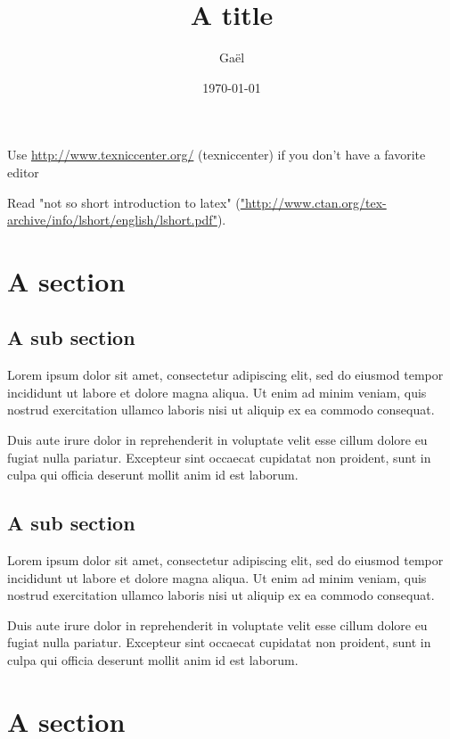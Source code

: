 \documentclass{article}
\begin{document}
\author{Gaël}
\date{\today}

\title{A title}

\maketitle

\tableofcontents

\pagebreak

Use \url{http://www.texniccenter.org/} (texniccenter) if you don't have a
favorite editor

Read "not so short introduction to latex"
(\url{"http://www.ctan.org/tex-archive/info/lshort/english/lshort.pdf"}).

\section{A section}

\subsection{A sub section}

Lorem ipsum dolor sit amet, consectetur adipiscing elit, sed do eiusmod
tempor incididunt ut labore et dolore magna aliqua. Ut enim ad minim
veniam, quis nostrud exercitation ullamco laboris nisi ut aliquip ex ea
commodo consequat.

\bigskip

Duis aute irure dolor in reprehenderit in voluptate velit esse cillum
dolore eu fugiat nulla pariatur. Excepteur sint occaecat cupidatat non
proident, sunt in culpa qui officia deserunt mollit anim id est laborum.

\subsection{A sub section}

Lorem ipsum dolor sit amet, consectetur adipiscing elit, sed do eiusmod
tempor incididunt ut labore et dolore magna aliqua. Ut enim ad minim
veniam, quis nostrud exercitation ullamco laboris nisi ut aliquip ex ea
commodo consequat.

\bigskip

Duis aute irure dolor in reprehenderit in voluptate velit esse cillum
dolore eu fugiat nulla pariatur. Excepteur sint occaecat cupidatat non
proident, sunt in culpa qui officia deserunt mollit anim id est laborum.

\section{A section}
\end{document}
